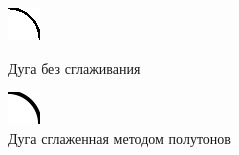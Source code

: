 \begin{figure}[h!]
    \centering
    \begin{minipage}{0.3\textwidth}
        \includegraphics[width=\textwidth]{дуга.png} %
        \caption{Дуга без сглаживания}
        \label{fig:image1}
    \end{minipage} %
    \hspace{0.1\textwidth}
    \begin{minipage}{0.3\textwidth}
        \includegraphics[width=\textwidth]{сглаженная дуга.png} %
        \caption{Дуга сглаженная методом полутонов}
        \label{fig:image2}
    \end{minipage}
\end{figure}

